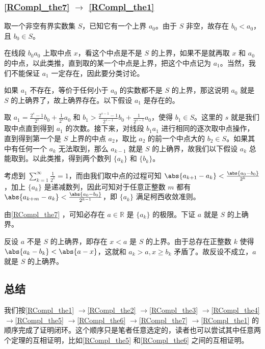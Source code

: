 \subsubsection{\autoref{RCompl_the7} $\to$ \autoref{RCompl_the1} }

取一个非空有界实数集 $S$，已知它有一个上界 $a_0$。由于 $S$ 非空，故存在 $b_0<a_0$，且 $b_0\in S$。

在线段 $b_0a_0$ 上取中点 $x$，看这个中点是不是 $S$ 的上界，如果不是就再取 $x$ 和 $a_0$ 的中点，以此类推，直到取的某一个中点是上界，把这个中点记为 $a_1$。当然，我们不能保证 $a_1$ 一定存在，因此要分类讨论。

如果 $a_1$ 不存在，等价于任何小于 $a_0$ 的实数都不是 $S$ 的上界，那这说明 $a_0$ 就是 $S$ 的上确界了，故上确界存在。以下假设 $a_1$ 是存在的。


取 $a_1=\frac{2^{s}-1}{2^{s}}b_0+\frac{1}{2^{s}}a_0$ 和 $b_1>\frac{2^{{s}-1}-1}{2^{{s}-1}}b_0+\frac{1}{2^{{s}-1}}a_0$，使得 $b_1\in S$。这里的 $s$ 就是我们取中点直到得到 $a_1$ 的次数。接下来，对线段 $b_1a_1$ 进行相同的逐次取中点操作，直到得到第一个是 $S$ 上界的中点 $a_2$，取比 $a_2$ 的前一个中点大的 $b_2\in S$。如果其中有任何一个 $a_k$ 无法取到，那么 $a_{k-1}$ 就是 $S$ 的上确界，故我们以下假设 $a_k$ 总能取到。以此类推，得到两个数列 $\{a_k\}$ 和 $\{b_k\}$。

考虑到 $\sum\limits_{k=1}^\infty \frac{1}{2^k}=1$，而由我们取中点的过程可知 $\abs{a_{k+1}-a_k}<\frac{\abs{a_0-b_0}}{2^k}$，加上 $\{a_k\}$ 是递减数列，因此可知对于任意正整数 $m$ 都有 $\abs{a_{k+m}-a_k}<\frac{\abs{a_0-b_0}}{2^{k-1}}$，即 $\{a_k\}$ 满足柯西收敛准则。

由\autoref{RCompl_the7} ，可知必存在 $a\in\mathbb{R}$ 是 $\{a_k\}$ 的极限。下证 $a$ 就是 $S$ 的上确界。

反设 $a$ 不是 $S$ 的上确界，即存在 $x<a$ 是 $S$ 的上界。由于总存在正整数 $k$ 使得 $\abs{a_k-b_k}<\abs{a-x}$，这就和 $a_k>a, x\geq b_k$ 矛盾了。故反设不成立，$a$ 就是 $S$ 的上确界。

\subsection{总结}

我们按\autoref{RCompl_the1} $\to$\autoref{RCompl_the2} $\to$\autoref{RCompl_the3} $\to$\autoref{RCompl_the4} $\to$\autoref{RCompl_the5} $\to$\autoref{RCompl_the6} $\to$\autoref{RCompl_the7} $\to$\autoref{RCompl_the1} 的顺序完成了证明闭环。这个顺序只是笔者任意选定的，读者也可以尝试其中任意两个定理的互相证明，比如\autoref{RCompl_the5} 和\autoref{RCompl_the6} 之间的互相证明。

